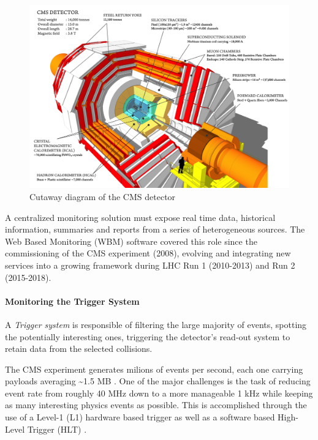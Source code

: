 \documentclass[a4, oneside, 11pt, nobib]{memoir}
\begin{document}
\begin{figure}[H]
    \centerline{
        \includegraphics[width=0.8\paperwidth]{figures/cms}}
    \caption{Cutaway diagram of the CMS detector \cite{Sakuma_2014}}
    \label{fig:cms}
\end{figure}

		A centralized monitoring solution must expose real time data, historical information, summaries and reports from a series of heterogeneous sources. The Web Based Monitoring (WBM) software covered this role since the commissioning of the CMS experiment (2008), evolving and integrating new services into a growing framework during LHC Run 1 (2010-2013) and Run 2 (2015-2018).
\pagebreak
		\paragraph{Monitoring the Trigger System}

		A \textit{Trigger system} is responsible of filtering the large majority of events, spotting the potentially interesting ones, triggering the detector's read-out system to retain data from the selected collisions.

		The CMS experiment generates milions of events per second, each one carrying payloads averaging \~{}1.5 MB \cite{smdaqatlhc2016v3pdf-2020-10-12}. One of the major challenges is the task of reducing event rate from roughly 40 MHz down to a more manageable 1 kHz while keeping as many interesting physics events as possible. This is accomplished through the use of a Level-1 (L1) \cite{Bayatyan:706847} hardware based trigger as well as a software based High-Level Trigger (HLT) \cite{Khachatryan_2017}. 
\end{document}
